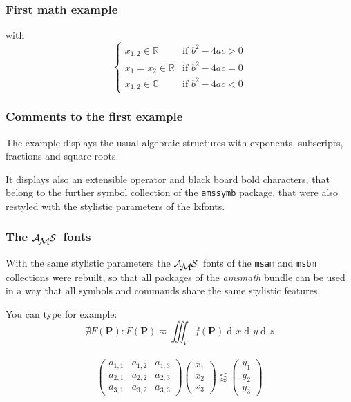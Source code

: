 \documentclass[usepdftitle=false]{beamer}\errorcontextlines=9
\newcommand\AMS{\ensuremath{\mathcal{A\!_{\textstyle M}\mkern-2mu S}}}
\DeclareMathOperator{\diff}{\mathrm{d}\!}
\def\TRON{\tracingcommands=2\tracingmacros=2\relax}
\def\TROF{\tracingcommands=0\tracingmacros=0\relax}
\begin{document}
\begin{frame}\frametitle{First math example}
\noindent with
\begin{equation}
\begin{cases}
x_{1,2} \in \mathbb{R} &\text{if } b^2-4ac>0\\
x_1=x_2 \in \mathbb{R} &\text{if } b^2-4ac=0\\
x_{1,2} \in \mathbb{C} &\text{if } b^2-4ac<0
\end{cases}
\end{equation}
\end{frame}

\begin{frame}\frametitle{Comments to the first example}
The example displays the usual algebraic structures with exponents, subscripts, fractions and square roots.

It displays also an extensible operator and \alert{black board bold} characters, that belong to the further symbol collection of the \texttt{amssymb} package, that were also restyled with the stylistic parameters of the lxfonts.

\end{frame}

\begin{frame}\frametitle{The \AMS\ fonts}
With the same stylistic parameters the \AMS\ fonts of the \texttt{msam} and \texttt{msbm} collections were rebuilt, so that all packages of the \textsl{amsmath} bundle can be used in a way that all symbols and commands share the same stylistic features. 

You can type for example:
\TRON\begin{equation}
\nexists F(\boldsymbol{P}) : F(\boldsymbol{P}) \eqsim \iiint_V f(\boldsymbol{P}) \diff x \diff y \diff z
\end{equation}\TROF
~
\TRON\begin{equation}
\begin{pmatrix}
a_{1,1} & a_{1,2} & a_{1,3}\\
a_{2,1} & a_{2,2} & a_{2,3}\\
a_{3,1} & a_{3,2} & a_{3,3}
\end{pmatrix}
\begin{pmatrix}
x_1 \\ x_2 \\ x_3
\end{pmatrix}
\lessapprox
\begin{pmatrix}
y_1 \\ y_2 \\ y_3
\end{pmatrix}
\end{equation}
\end{frame}
\end{document}
